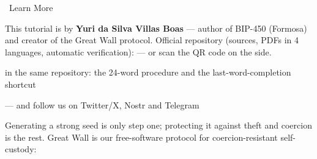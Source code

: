 \documentclass[10pt]{article}
\begin{document}
\begin{infobox}{\faInfoCircle~Learn More}
\begin{minipage}[c]{0.8\textwidth}
This tutorial is by \textbf{Yuri da Silva Villas Boas} --- author of BIP-450 (Formosa) and creator of the Great Wall protocol. Official repository (sources, PDFs in 4 languages, automatic verification): \repolink --- or scan the QR code on the side.

\begin{description}[itemsep=1pt]
 \item [Extended edition --- 24 words:] in the same repository: the 24-word procedure and the last-word-completion shortcut
 \item [More tutorials, courses and community:] \sitelink --- and follow us on Twitter/X, Nostr and Telegram
 \item [Great Wall:] Generating a strong seed is only step one; protecting it against theft and coercion is the rest. Great Wall is our free-software protocol for coercion-resistant self-custody: \gwlink
\end{description}

\end{minipage}%
\hfill
\begin{minipage}[c]{0.15\textwidth}
\centering
\repoqr
\end{minipage}
\end{infobox}

\end{document}
